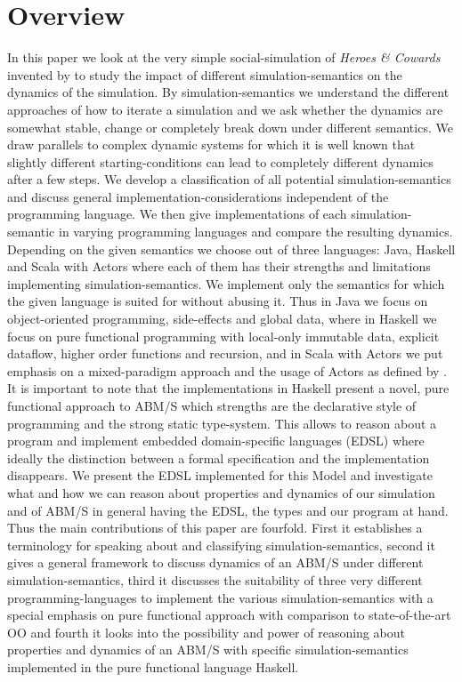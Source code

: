 \section{Overview}
In this paper we look at the very simple social-simulation of \textit{Heroes \& Cowards} invented by \cite{wilensky_introduction_2015} to study the impact of different simulation-semantics on the dynamics of the simulation. By simulation-semantics we understand the different approaches of how to iterate a simulation and we ask whether the dynamics are somewhat stable, change or completely break down under different semantics. We draw parallels to complex dynamic systems for which it is well known that slightly different starting-conditions can lead to completely different dynamics after a few steps. We develop a classification of all potential simulation-semantics and discuss general implementation-considerations independent of the programming language. We then give implementations of each simulation-semantic in varying programming languages and compare the resulting dynamics. Depending on the given semantics we choose out of three languages: Java, Haskell and Scala with Actors where each of them has their strengths and limitations implementing simulation-semantics. We implement only the semantics for which the given language is suited for without abusing it. Thus in Java we focus on object-oriented programming, side-effects and global data, where in Haskell we focus on pure functional programming with local-only immutable data, explicit dataflow, higher order functions and recursion, and in Scala with Actors we put emphasis on a mixed-paradigm approach and the usage of Actors as defined by \cite{agha_actors:_1986}. \\
It is important to note that the implementations in Haskell present a novel, pure functional approach to ABM/S which strengths are the declarative style of programming and the strong static type-system. This allows to reason about a program and implement embedded domain-specific languages (EDSL) where ideally the distinction between a formal specification and the implementation disappears. We present the EDSL implemented for this Model and investigate what and how we can reason about properties and dynamics of our simulation and of ABM/S in general having the EDSL, the types and our program at hand. \\
Thus the main contributions of this paper are fourfold. First it establishes a terminology for speaking about and classifying simulation-semantics, second it gives a general framework to discuss dynamics of an ABM/S under different simulation-semantics, third it discusses the suitability of three very different programming-languages to implement the various simulation-semantics with a special emphasis on pure functional approach with comparison to state-of-the-art OO and fourth it looks into the possibility and power of reasoning about properties and dynamics of an ABM/S with specific simulation-semantics implemented in the pure functional language Haskell.

